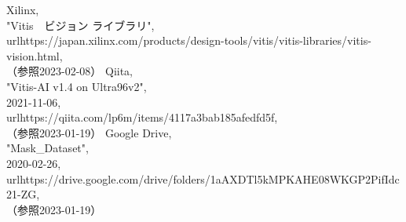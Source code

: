 \documentclass[11pt,a4j]{jreport}
\begin{document}
\begin{thebibliography}{99}
   Xilinx, \\"Vitis　ビジョン ライブラリ", \\ url{https://japan.xilinx.com/products/design-tools/vitis/vitis-libraries/vitis-vision.html}, \\（参照2023-02-08）
   Qiita, \\"Vitis-AI v1.4 on Ultra96v2", \\2021-11-06, \\url{https://qiita.com/lp6m/items/4117a3bab185afedfd5f}, \\（参照2023-01-19）
   Google Drive, \\"Mask_Dataset", \\2020-02-26, \\url{https://drive.google.com/drive/folders/1aAXDTl5kMPKAHE08WKGP2PifIdc21-ZG}, \\（参照2023-01-19）
\end{thebibliography}
\end{document}
